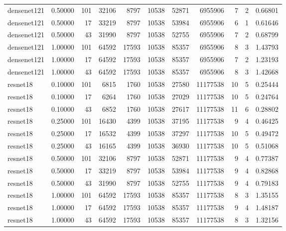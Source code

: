 \begin{tabular}{lrrrrrrrrrr}
densenet121 & 0.50000 & 101 & 32106 & 8797 & 10538 & 52871 & 6955906 & 7 & 2 & 0.66801 \\
densenet121 & 0.50000 & 17 & 33219 & 8797 & 10538 & 53984 & 6955906 & 6 & 1 & 0.61646 \\
densenet121 & 0.50000 & 43 & 31990 & 8797 & 10538 & 52755 & 6955906 & 7 & 2 & 0.68799 \\
densenet121 & 1.00000 & 101 & 64592 & 17593 & 10538 & 85357 & 6955906 & 8 & 3 & 1.43793 \\
densenet121 & 1.00000 & 17 & 64592 & 17593 & 10538 & 85357 & 6955906 & 7 & 2 & 1.23193 \\
densenet121 & 1.00000 & 43 & 64592 & 17593 & 10538 & 85357 & 6955906 & 8 & 3 & 1.42668 \\
resnet18 & 0.10000 & 101 & 6815 & 1760 & 10538 & 27580 & 11177538 & 10 & 5 & 0.25444 \\
resnet18 & 0.10000 & 17 & 6264 & 1760 & 10538 & 27029 & 11177538 & 10 & 5 & 0.24764 \\
resnet18 & 0.10000 & 43 & 6852 & 1760 & 10538 & 27617 & 11177538 & 11 & 6 & 0.28802 \\
resnet18 & 0.25000 & 101 & 16430 & 4399 & 10538 & 37195 & 11177538 & 9 & 4 & 0.46425 \\
resnet18 & 0.25000 & 17 & 16532 & 4399 & 10538 & 37297 & 11177538 & 10 & 5 & 0.49472 \\
resnet18 & 0.25000 & 43 & 16165 & 4399 & 10538 & 36930 & 11177538 & 10 & 5 & 0.51068 \\
resnet18 & 0.50000 & 101 & 32106 & 8797 & 10538 & 52871 & 11177538 & 9 & 4 & 0.77387 \\
resnet18 & 0.50000 & 17 & 33219 & 8797 & 10538 & 53984 & 11177538 & 9 & 4 & 0.82868 \\
resnet18 & 0.50000 & 43 & 31990 & 8797 & 10538 & 52755 & 11177538 & 9 & 4 & 0.79183 \\
resnet18 & 1.00000 & 101 & 64592 & 17593 & 10538 & 85357 & 11177538 & 8 & 3 & 1.35155 \\
resnet18 & 1.00000 & 17 & 64592 & 17593 & 10538 & 85357 & 11177538 & 9 & 4 & 1.48187 \\
resnet18 & 1.00000 & 43 & 64592 & 17593 & 10538 & 85357 & 11177538 & 8 & 3 & 1.32156 \\
\bottomrule
\end{tabular}
